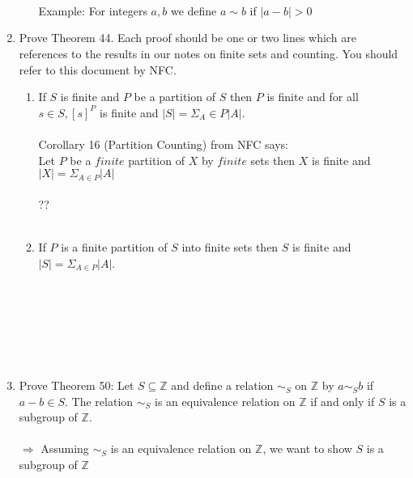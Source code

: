 \documentclass[11pt]{article}
\begin{document}
\begin{enumerate}
\begin{enumerate}
\\
\\
\\
\\
\\
\\
\\
\\

Example: For integers $a,b$ we define $a \sim b$ if $|a-b| > 0$
\end{enumerate}

\newpage %
\item Prove Theorem 44. Each proof should be one or two lines which are references to the results in our notes on finite sets and counting. You should refer to this document by NFC.
\begin{enumerate}
\item If $S$ is finite and $P$ be a partition of $S$ then $P$ is finite and for all $s \in S, [s]^P$ is finite and $|S| = \Sigma_A \in P|A|$.
\\
\\
Corollary 16 (Partition Counting) from NFC says:\\
Let $P$ be a $finite$ partition of $X$ by $finite$ sets then $X$ is finite and $|X| = \Sigma_{A \in P}|A|$
\\
\\
??
\\
\\

\item If $P$ is a finite partition of $S$ into finite sets then $S$ is finite and $|S| = \Sigma_{A \in P}|A|$.
\\
\\
\\
\\
\\
\\
\\

\end{enumerate}

\newpage %
\item Prove Theorem 50: Let $S \subseteq \mathbb{Z}$ and define a relation $\sim_S$ on $\mathbb{Z}$ by $a \sim_S b$ if $a-b \in S$.  The relation $\sim_S$ is an equivalence relation on $\mathbb{Z}$ if and only if $S$ is a subgroup of $\mathbb{Z}$.\\
\\
$\Rightarrow$ Assuming $\sim_S$ is an equivalence relation on $\mathbb{Z}$, we want to show $S$ is a subgroup of $\mathbb{Z}$
\\
\\
\\
\\
\\


\end{enumerate}
\end{document}
